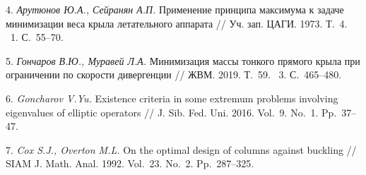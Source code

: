 4. {\it Арутюнов Ю.А., Сейранян А.П.}
Применение принципа максимума к задаче минимизации веса крыла
летательного аппарата
// Уч. зап. ЦАГИ. 1973. Т.~4. \textnumero~1. С.~55\nobreakdash--70.


5. {\it Гончаров В.Ю., Муравей Л.А.}
Минимизация массы тонкого прямого крыла при ограничении по скорости дивергенции
// ЖВМ. 2019. Т.~59. \textnumero~3. С.~465\nobreakdash--480.

6. {\it Goncharov V.Yu.}
Existence criteria in some extremum problems involving eigenvalues of elliptic operators
// J. Sib. Fed. Uni. 2016. Vol.~9. No.~1. Pp.~37\nobreakdash--47.

7. {\it Cox S.J., Overton M.L.}
On the optimal design of columns against buckling
// SIAM J. Math. Anal. 1992. Vol.~23. No.~2. Pp.~287\nobreakdash--325.
